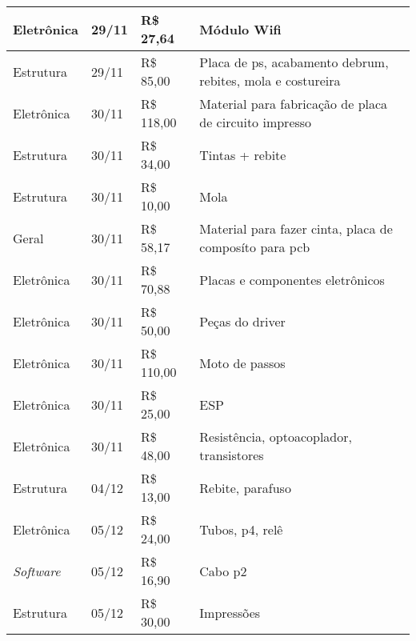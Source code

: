 \begin{table}[htp]
\begin{tabular}{|l|l|l|l|}
Eletrônica & 29/11 & R\$ 27,64 & Módulo Wifi \\ \hline
Estrutura & 29/11 & R\$ 85,00 & Placa de ps, acabamento debrum, rebites, mola e costureira \\ \hline
Eletrônica & 30/11 & R\$ 118,00 & Material para fabricação de placa de circuito impresso \\ \hline
Estrutura & 30/11 & R\$ 34,00 & Tintas + rebite \\ \hline
Estrutura & 30/11 & R\$ 10,00 & Mola \\ \hline
Geral & 30/11 & R\$ 58,17 & Material para fazer cinta, placa de composíto para pcb \\ \hline
Eletrônica & 30/11 & R\$ 70,88 & Placas e componentes eletrônicos \\ \hline
Eletrônica & 30/11 & R\$ 50,00 & Peças do driver \\ \hline
Eletrônica & 30/11 & R\$ 110,00 & Moto de passos \\ \hline
Eletrônica & 30/11 & R\$ 25,00 & ESP \\ \hline
Eletrônica & 30/11 & R\$ 48,00 & Resistência, optoacoplador, transistores \\ \hline
Estrutura & 04/12 & R\$ 13,00 & Rebite, parafuso \\ \hline
Eletrônica & 05/12 & R\$ 24,00 & Tubos, p4, relê \\ \hline
\textit{Software}& 05/12 & R\$ 16,90 & Cabo p2 \\ \hline
Estrutura & 05/12 & R\$ 30,00 & Impressões \\ \hline

\end{tabular}
\end{table}